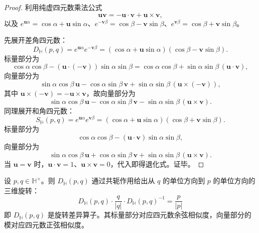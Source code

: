 \begin{proof}
利用纯虚四元数乘法公式
\[
\mathbf u\mathbf v=-\mathbf u\cdot\mathbf v+\mathbf u\times\mathbf v,
\]
以及 $e^{\mathbf u\alpha}=\cos\alpha+\mathbf u\sin\alpha$、$e^{-\mathbf v\beta}=\cos\beta-\mathbf v\sin\beta$、$e^{\mathbf v\beta}=\cos\beta+\mathbf v\sin\beta$。

先展开差角四元数：
\[
D_{\mathbb H}(p,q)=e^{\mathbf u\alpha}e^{-\mathbf v\beta}
=
(\cos\alpha+\mathbf u\sin\alpha)(\cos\beta-\mathbf v\sin\beta).
\]
标量部分为
\[
\cos\alpha\cos\beta-(\mathbf u\cdot(-\mathbf v))\sin\alpha\sin\beta
=
\cos\alpha\cos\beta+\sin\alpha\sin\beta\,(\mathbf u\cdot\mathbf v),
\]
向量部分为
\[
\sin\alpha\cos\beta\,\mathbf u-\cos\alpha\sin\beta\,\mathbf v
+\sin\alpha\sin\beta\,(\mathbf u\times(-\mathbf v)),
\]
其中 $\mathbf u\times(-\mathbf v)=-\mathbf u\times\mathbf v$，故向量部分为
\[
\sin\alpha\cos\beta\,\mathbf u-\cos\alpha\sin\beta\,\mathbf v-\sin\alpha\sin\beta\,(\mathbf u\times\mathbf v).
\]
同理展开和角四元数：
\[
S_{\mathbb H}(p,q)=e^{\mathbf u\alpha}e^{\mathbf v\beta}
=
(\cos\alpha+\mathbf u\sin\alpha)(\cos\beta+\mathbf v\sin\beta).
\]
标量部分为
\[
\cos\alpha\cos\beta-(\mathbf u\cdot\mathbf v)\sin\alpha\sin\beta,
\]
向量部分为
\[
\sin\alpha\cos\beta\,\mathbf u+\cos\alpha\sin\beta\,\mathbf v+\sin\alpha\sin\beta\,(\mathbf u\times\mathbf v).
\]
当 $\mathbf u=\mathbf v$ 时，$\mathbf u\cdot\mathbf v=1$、$\mathbf u\times\mathbf v=0$，代入即得退化式。证毕。
\end{proof}

\begin{proposition}[差角四元数是三维旋转差异算子]\label{prop:quaternion_exp_similarity_rotation_operator}
设 $p,q\in\mathbb H^\times$。则 $D_{\mathbb H}(p,q)$ 通过共轭作用给出从 $q$ 的单位方向到 $p$ 的单位方向的三维旋转：
\[
\boxed{
D_{\mathbb H}(p,q)\cdot \frac{q}{|q|}\cdot D_{\mathbb H}(p,q)^{-1}
=
\frac{p}{|p|}
}
\]
即 $D_{\mathbb H}(p,q)$ 是旋转差异算子。其标量部分对应四元数余弦相似度，向量部分的模对应四元数正弦相似度。
\end{proposition}

